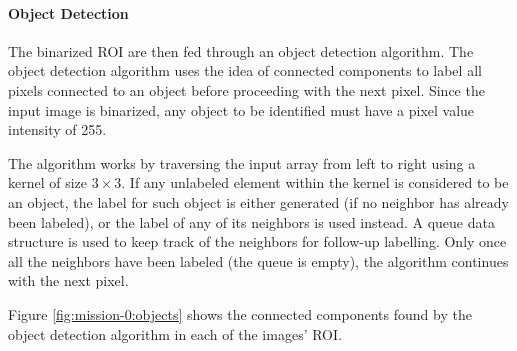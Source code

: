 \paragraph{Object Detection} \label{paragraph:case-study:impl:objects}
The binarized ROI are then fed through an object detection algorithm. The object detection algorithm uses the idea of connected components to label all pixels connected to an object before proceeding with the next pixel. Since the input image is binarized, any object to be identified must have a pixel value intensity of 255. 

The algorithm works by traversing the input array from left to right using a kernel of size $3 \times 3$. If any unlabeled element within the kernel is considered to be an object, the label for such object is either generated (if no neighbor has already been labeled), or the label of any of its neighbors is used instead. A queue data structure is used to keep track of the neighbors for follow-up labelling. Only once all the neighbors have been labeled (the queue is empty), the algorithm continues with the next pixel.

Figure \ref{fig:mission-0:objects} shows the connected components found by the object detection algorithm in each of the images' ROI.

